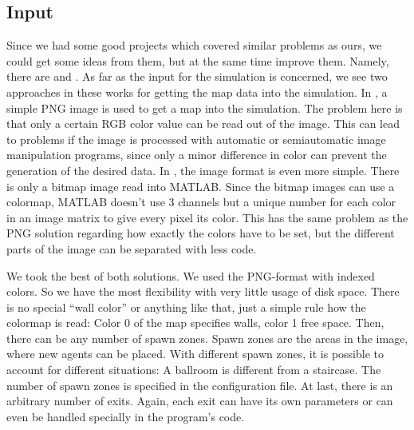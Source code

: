 \documentclass[11pt]{article}
\begin{document}
\subsection{Input}

\label{sub:input}

Since we had some good projects which covered similar
problems as ours, we could get some ideas from them, but at the same time
improve them.  Namely, there are \cite{multilevel} and \cite{airplane}.  As far
as the input for the simulation is concerned, we see two approaches in these
works for getting the map data into the simulation.  In \cite{multilevel}, a
simple PNG image is used to get a map into the simulation. The problem here is
that only a certain RGB color value can be read out of the image.  This can
lead to problems if the image is processed with automatic or semiautomatic
image manipulation programs, since only a minor difference in color can prevent
the generation of the desired data.  In \cite{airplane}, the image format is
even more simple.  There is only a bitmap image read into MATLAB.  Since the
bitmap images can use a colormap, MATLAB doesn't use 3 channels but a unique
number for each color in an image matrix to give every pixel its color.  This
has the same problem as the PNG solution regarding how exactly the colors have
to be set, but the different parts of the image can be separated with less
code.

We took the best of both solutions. We used the PNG-format with indexed colors.
So we have the most flexibility with very little usage of disk space.  There is
no special ``wall color'' or anything like that, just a simple rule how the
colormap is read: Color 0 of the map specifies walls, color 1 free space.
Then, there can be any number of spawn zones.  Spawn zones are the areas in the
image, where new agents can be placed. With different spawn zones, it is
possible to account for different situations: A ballroom is different from a
staircase.  The number of spawn zones is specified in the configuration file.
At last, there is an arbitrary number of exits.  Again, each exit can have its
own parameters or can even be handled specially in the program's code. 
\end{document}
